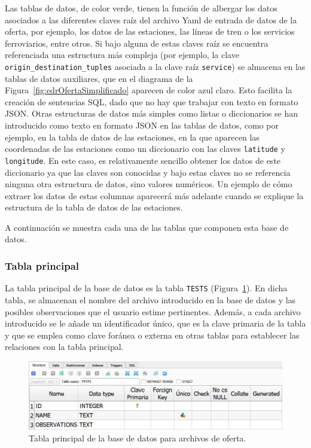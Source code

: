 Las tablas de datos, de color verde, tienen la función de albergar los datos asociados a las diferentes claves raíz del archivo \acrshort{Yaml} de entrada de datos de la oferta, por ejemplo, los datos de las estaciones, las líneas de tren o los servicios ferroviarios, entre otros. Si bajo alguna de estas claves raíz se encuentra referenciada una estructura más compleja (por ejemplo, la clave \texttt{origin\_destination\_tuples} asociada a la clave raíz \texttt{service}) se almacena en las tablas de datos auxiliares, que en el diagrama de la Figura~\ref{fig:edrOfertaSimplificado} aparecen de color azul claro. Esto facilita la creación de sentencias \acrshort{SQL}, dado que no hay que trabajar con texto en formato \acrshort{JSON}. Otras estructuras de datos más simples como listas o diccionarios se han introducido como texto en formato \acrshort{JSON} en las tablas de datos, como por ejemplo, en la tabla de datos de las estaciones, en la que aparecen las coordenadas de las estaciones como un diccionario con las claves \texttt{latitude} y \texttt{longitude}. En este caso, es relativamente sencillo obtener los datos de este diccionario ya que las claves son conocidas y bajo estas claves no se referencia ninguna otra estructura de datos, sino valores numéricos. Un ejemplo de cómo extraer los datos de estas columnas aparecerá más adelante cuando se explique la estructura de la tabla de datos de las estaciones.

A continuación se muestra cada una de las tablas que componen esta base de datos.

\subsubsection{Tabla principal}
La tabla principal de la base de datos es la tabla \texttt{TESTS} (Figura~\ref{fig:dbSupplyTESTS}). En dicha tabla, se almacenan el nombre del archivo introducido en la base de datos y las posibles observaciones que el usuario estime pertinentes. Además, a cada archivo introducido se le añade un identificador único, que es la clave primaria de la tabla y que se emplea como clave foránea o externa en otras tablas para establecer las relaciones con la tabla principal.

\begin{figure}[H]
\centering
\includegraphics[width=.9\textwidth]{fig/Tablas base de datos/Oferta/TESTS.png}
\caption{Tabla principal de la base de datos para archivos de oferta.}
\label{fig:dbSupplyTESTS}
\end{figure}

